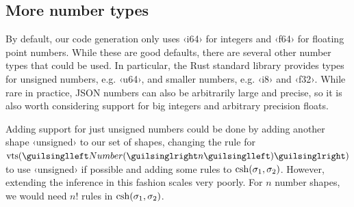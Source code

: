 %




\subsection{More number types}
\label{sec:unsigned}

By default, our code generation only uses ‹i64› for integers and ‹f64› for floating point numbers. While these are good defaults, there are several other number types that could be used. In particular, the Rust standard library provides types for unsigned numbers, e.g. ‹u64›, and smaller numbers, e.g. ‹i8› and ‹f32›. While rare in practice, JSON numbers can also be arbitrarily large and precise, so it is also worth considering support for big integers and arbitrary precision floats.

Adding support for just unsigned numbers could be done by adding another shape ‹unsigned› to our set of shapes, changing the rule for $\shap(‹Number(›n‹)›)$ to use ‹unsigned› if possible and adding some rules to $\operatorname{csh}(\sigma_1, \sigma_2)$. However, extending the inference in this fashion scales very poorly. For $n$ number shapes, we would need $n!$ rules in $\operatorname{csh}(\sigma_1, \sigma_2)$.

